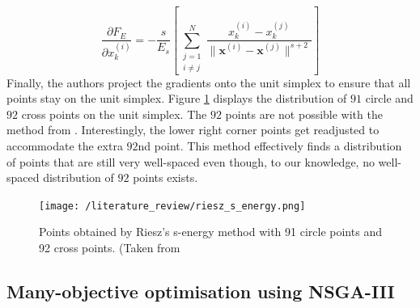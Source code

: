 \documentclass[mscthesis, 11pt]{usiinfthesis}
\theoremstyle{newdefinition}
\begin{document}
\begin{equation}
    \frac{\partial F_E}{\partial x_{k}^{(i)}} = - \frac{s}{E_s} \left[\sum_{\substack{j = 1 \\ i \neq j}}^N \frac{x^{(i)}_k - x^{(j)}_k}{\lVert \mathbf{x}^{(i)} - \mathbf{x}^{(j)} \rVert^{s+2}} \right]
\end{equation}
Finally, the authors project the gradients onto the unit simplex to ensure that all points stay on the unit simplex. Figure \ref{fig:riesz_s_energy_91_92} displays the distribution of $91$ circle and $92$ cross points on the unit simplex. The $92$ points are not possible with the method from \cite{das_normal-boundary_1998}. Interestingly, the lower right corner points get readjusted to accommodate the extra $92$nd point. This method effectively finds a distribution of points that are still very well-spaced even though, to our knowledge, no well-spaced distribution of $92$ points exists.
\begin{figure}[ht]
    \centering
    \texttt{[image: /literature\_review/riesz\_s\_energy.png]}
    \caption{Points obtained by Riesz's s-energy method with 91 circle points and 92 cross points. (Taken from \cite[~p.~57]{blank_generating_2021}}
    \label{fig:riesz_s_energy_91_92}
\end{figure}
\clearpage
\subsection{Many-objective optimisation using NSGA-III}
\end{document}
